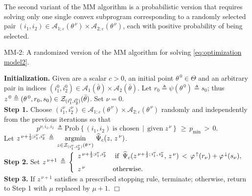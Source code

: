 \documentclass{siamart}
\newcommand{\epc}{\hspace{1pc}}
\newcommand{\wh}{\widehat}
\begin{document}
The second variant of the  MM algorithm is a probabilistic version  that requires solving only one single convex subprogram corresponding
to a randomly selected pair $(i_1,i_2)\in \mathcal{A}_{1;\varepsilon}(\theta^{\,\nu})\times \mathcal{A}_{2;\varepsilon}(\theta^{\,\nu})$,
each with positive probability of being selected.



\noindent\makebox[\linewidth]{\rule{\textwidth}{1pt}}

\noindent MM-2: A randomized version of the MM algorithm for solving \eqref{eq:optimization model2}.

\noindent\makebox[\linewidth]{\rule{\textwidth}{1pt}}

\noindent
{\bf Initialization.}
Given are a scalar $c > 0$, an initial point $\theta^{\, 0} \in \Theta$ and an arbitrary
pair in indices $( i_1^0, i_2^0  )\in \mathcal{A}_1( \bar{\theta} ) \times \mathcal{A}_2( \bar{\theta} )$.  Let
$r_0 \triangleq \psi( \theta^{\, 0} ) \triangleq s_0$; thus
$z^{\, 0} \triangleq ( \theta^{\, 0}, r_0, s_0 ) \in {\cal Z}_{(i_1^0,i_2^0)}( \bar{\theta} )$.  Set $\nu = 0$. \\[0.05in]
\noindent
{\bf Step 1.} Choose $(i_1^\nu,i_2^\nu)\in \mathcal{A}_{1;\varepsilon}(\theta^{\,\nu})\times \mathcal{A}_{2;\varepsilon}(\theta^{\,\nu})$ randomly and independently from the previous iterations so that
$$
p^{\nu,i_1,i_2}\,\triangleq \mbox{Prob}\left\{(i_1,i_2)\; \mbox{is chosen}\, \mid\,  \mbox{given}\; z^{\,\nu}\right\}  \, \geq\,  p_{\min} \,> \, 0.
$$
Let  $z^{\,\nu+\frac{1}{2}; i_1^\nu, i_2^\nu} \,\triangleq \, \displaystyle\operatornamewithlimits{\mbox{argmin}}_{z \in {\cal Z}_{(i_1^{\nu},i_2^{\nu})}(\theta^{\, \nu})}
 \, \wh{\Psi}_c(z,\,z^{\, \nu})$. \\[0.05in]
\noindent
{\bf Step 2.} Set $z^{\,\nu+1} \,\triangleq \, \left\{\begin{array}{ll}
z^{\,\nu+\frac{1}{2}; {i}_1^\nu,{i}_2^\nu}  \epc {\rm if}\;\, \wh{\Psi}_c%
(z^{\,\nu+\frac{1}{2};\,{i}_1^\nu,\,{i}_2^\nu},\,z^{\,\nu}) \, <\, \varphi^{\,\uparrow}(r_{\nu})+\varphi^{\,\downarrow}(s_{\nu}),\\[0.1in]

z^{\,\nu}  \qquad\qquad {\rm otherwise}.
\end{array}\right.
$\\[0.05in]
\noindent
{\bf Step 3.}  If $z^{\,\nu+1}$ satisfies a prescribed stopping rule, terminate; otherwise, return to Step 1 with $\mu$ replaced by $\mu+1$.
\hfill $\Box$
\noindent\makebox[\linewidth]{\rule{\textwidth}{1pt}}
\end{document}
